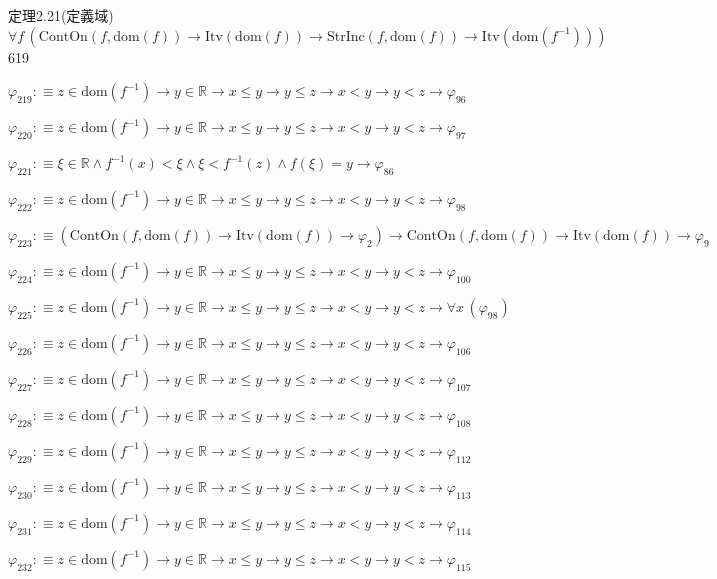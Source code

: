 \begin{fullproof}{定理2.21(定義域)}{$\forall f\,(\mathrm{ContOn}(f,\mathrm{dom}(f)) \to \mathrm{Itv}(\mathrm{dom}(f)) \to \mathrm{StrInc}(f,\mathrm{dom}(f)) \to \mathrm{Itv}(\mathrm{dom}(f^{-1})))$}{619}
\begin{abbrevlist}
\item $\varphi_{219} :\equiv z \in \mathrm{dom}(f^{-1}) \to y \in \mathbb{R} \to x \leq y \to y \leq z \to x < y \to y < z \to \varphi_{96}$
\item $\varphi_{220} :\equiv z \in \mathrm{dom}(f^{-1}) \to y \in \mathbb{R} \to x \leq y \to y \leq z \to x < y \to y < z \to \varphi_{97}$
\item $\varphi_{221} :\equiv \xi \in \mathbb{R} \land f^{-1}(x) < \xi \land \xi < f^{-1}(z) \land f(\xi) = y \to \varphi_{86}$
\item $\varphi_{222} :\equiv z \in \mathrm{dom}(f^{-1}) \to y \in \mathbb{R} \to x \leq y \to y \leq z \to x < y \to y < z \to \varphi_{98}$
\item $\varphi_{223} :\equiv (\mathrm{ContOn}(f,\mathrm{dom}(f)) \to \mathrm{Itv}(\mathrm{dom}(f)) \to \varphi_{2}) \to \mathrm{ContOn}(f,\mathrm{dom}(f)) \to \mathrm{Itv}(\mathrm{dom}(f)) \to \varphi_{9}$
\item $\varphi_{224} :\equiv z \in \mathrm{dom}(f^{-1}) \to y \in \mathbb{R} \to x \leq y \to y \leq z \to x < y \to y < z \to \varphi_{100}$
\item $\varphi_{225} :\equiv z \in \mathrm{dom}(f^{-1}) \to y \in \mathbb{R} \to x \leq y \to y \leq z \to x < y \to y < z \to \forall x\,(\varphi_{98})$
\item $\varphi_{226} :\equiv z \in \mathrm{dom}(f^{-1}) \to y \in \mathbb{R} \to x \leq y \to y \leq z \to x < y \to y < z \to \varphi_{106}$
\item $\varphi_{227} :\equiv z \in \mathrm{dom}(f^{-1}) \to y \in \mathbb{R} \to x \leq y \to y \leq z \to x < y \to y < z \to \varphi_{107}$
\item $\varphi_{228} :\equiv z \in \mathrm{dom}(f^{-1}) \to y \in \mathbb{R} \to x \leq y \to y \leq z \to x < y \to y < z \to \varphi_{108}$
\item $\varphi_{229} :\equiv z \in \mathrm{dom}(f^{-1}) \to y \in \mathbb{R} \to x \leq y \to y \leq z \to x < y \to y < z \to \varphi_{112}$
\item $\varphi_{230} :\equiv z \in \mathrm{dom}(f^{-1}) \to y \in \mathbb{R} \to x \leq y \to y \leq z \to x < y \to y < z \to \varphi_{113}$
\item $\varphi_{231} :\equiv z \in \mathrm{dom}(f^{-1}) \to y \in \mathbb{R} \to x \leq y \to y \leq z \to x < y \to y < z \to \varphi_{114}$
\item $\varphi_{232} :\equiv z \in \mathrm{dom}(f^{-1}) \to y \in \mathbb{R} \to x \leq y \to y \leq z \to x < y \to y < z \to \varphi_{115}$

\end{abbrevlist}
\end{fullproof}

